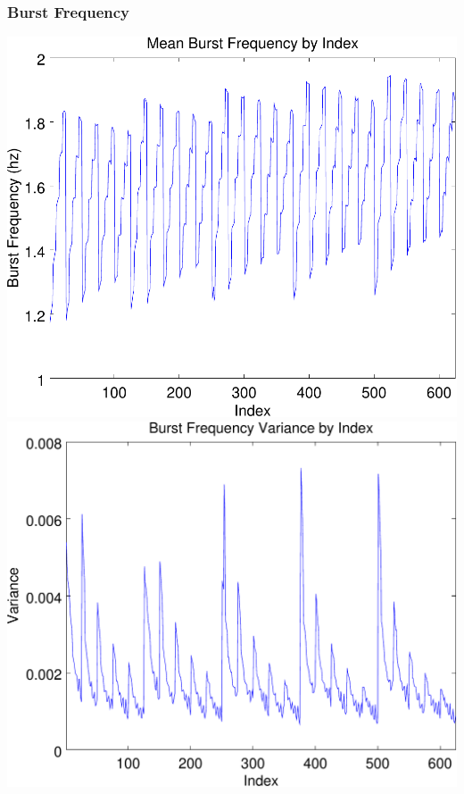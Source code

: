 \documentclass{beamer}
\theoremstyle{plain}
\theoremstyle{definition}
\begin{document}
\begin{frame}\frametitle{Burst Frequency}
  \begin{center}
    \includegraphics[scale=.32]{BurstFrequency.pdf}%
    \includegraphics[scale=.32]{BurstFrequencyVariance.pdf}
  \end{center}
\end{frame}
\end{document}
